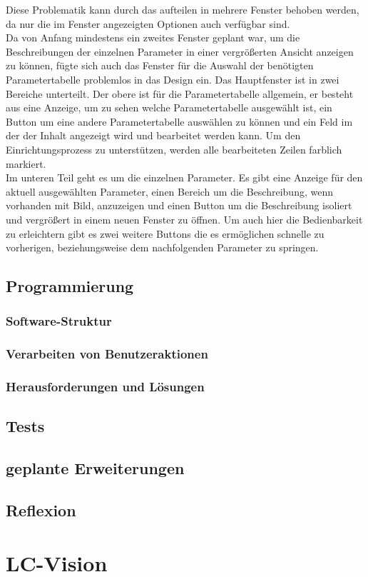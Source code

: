 \documentclass[10pt,a4paper]{article}
\begin{document}
Diese Problematik kann durch das aufteilen in mehrere Fenster behoben werden, da nur die im Fenster angezeigten Optionen auch verfügbar sind. 
\\Da von Anfang mindestens ein zweites Fenster geplant war, um die Beschreibungen der einzelnen Parameter in einer vergrößerten Ansicht anzeigen zu können, fügte sich auch das Fenster für die Auswahl der benötigten Parametertabelle problemlos in das Design ein. 
Das Hauptfenster ist in zwei Bereiche unterteilt. Der obere ist für die Parametertabelle allgemein, er besteht aus eine Anzeige, um zu sehen welche Parametertabelle ausgewählt ist, ein Button um eine andere Parametertabelle auswählen zu können und ein Feld im der der Inhalt angezeigt wird und bearbeitet werden kann. Um den Einrichtungsprozess zu unterstützen, werden alle bearbeiteten Zeilen farblich markiert.
\\Im unteren Teil geht es um die einzelnen Parameter. Es gibt eine Anzeige für den aktuell ausgewählten Parameter, einen Bereich um die Beschreibung, wenn vorhanden mit Bild, anzuzeigen und einen Button um die Beschreibung isoliert und vergrößert in einem neuen Fenster zu öffnen. Um auch hier die Bedienbarkeit zu erleichtern gibt es zwei weitere Buttons die es ermöglichen schnelle zu vorherigen, beziehungsweise dem nachfolgenden Parameter zu springen.
\subsection{Programmierung}
\subsubsection{Software-Struktur}
\subsubsection{Verarbeiten von Benutzeraktionen}
\subsubsection{Herausforderungen und Lösungen}
\subsection{Tests}
\subsection{geplante Erweiterungen}
\subsection{Reflexion}

\section{LC-Vision}
\end{document}
